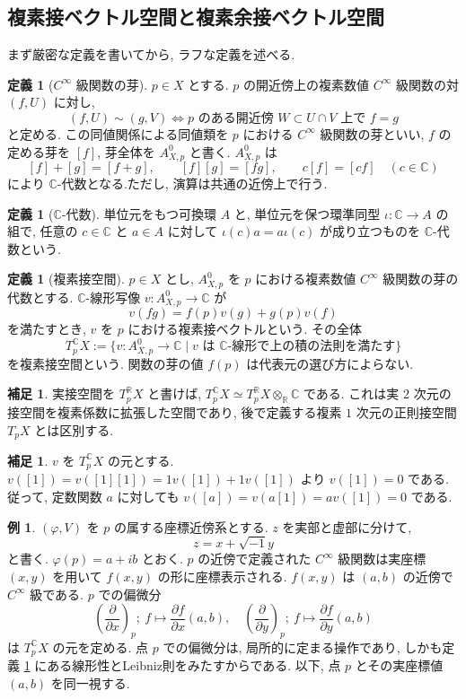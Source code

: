 \documentclass[dvipdfmx,a4paper,11pt]{article} %
\newcommand{\C}{\mathbb{C}}
\theoremstyle{definition}
\numberwithin{equation}{section}
\newtheorem{dfn}[thm]{定義}
\newtheorem{rem}[thm]{補足}
\newtheorem{ex}[thm]{例}
\begin{document}
\subsection{複素接ベクトル空間と複素余接ベクトル空間}\label{O-S018}

まず厳密な定義を書いてから, ラフな定義を述べる. 
\begin{dfn}[$C^\infty$ 級関数の芽]\label{dfn-smooth-germ}
$p\in X$ とする.
$p$ の開近傍上の複素数値 $C^\infty$ 級関数の対 $(f,U)$ に対し, 
\[
(f,U)\sim(g,V)
\iff
p\text{ のある開近傍 }W\subset U\cap V\text{ 上で }f=g
\]
と定める.
この同値関係による同値類を $p$ における $C^\infty$ 級関数の芽といい, 
$f$ の定める芽を $[f]$, 芽全体を $A^0_{X,p}$ と書く.
$A^0_{X,p}$ は
\[
[f]+[g]=[f+g],\qquad [f][g]=[fg],\qquad c[f]=[cf]\quad(c\in\C)
\]
により $\C$-代数となる.ただし, 演算は共通の近傍上で行う.
\end{dfn}

\begin{dfn}[$\C$-代数]
単位元をもつ可換環 $A$ と, 単位元を保つ環準同型
\(
\iota:\C\longrightarrow A
\)
の組で, 任意の $c\in\C$ と $a\in A$ に対して
\(
\iota(c)a=a\iota(c)
\)
が成り立つものを $\C$-代数という.
\end{dfn}

\begin{dfn}[複素接空間]\label{O-M078}
$p\in X$ とし, $A^0_{X,p}$ を $p$ における複素数値 $C^\infty$ 級関数の芽の代数とする.
$\C$-線形写像 $v:A^0_{X,p}\to\C$ が
\[
v(fg)=f(p)v(g)+g(p)v(f)
\]
を満たすとき, $v$ を $p$ における複素接ベクトルという.
その全体
\[
T_p^{\C}X
:=
\{v:A^0_{X,p}\to\C\mid v\text{ は }\C\text{-線形で上の積の法則を満たす}\}
\]
を複素接空間という.
関数の芽の値 $f(p)$ は代表元の選び方によらない.
\end{dfn}
\begin{rem}
実接空間を $T_p^{\mathbb R}X$ と書けば,
$T_p^\C X\simeq T_p^{\mathbb R}X\otimes_{\mathbb R}\C$ である.
これは実 $2$ 次元の接空間を複素係数に拡張した空間であり,
後で定義する複素 $1$ 次元の正則接空間 $T_pX$ とは区別する.
\end{rem}

\begin{rem}
$v$ を $T_{p}^{\C}X$ の元とする. $v([1])=v([1][1])=1v([1])+1v([1])$ より $v([1])=0$ である. 従って, 定数関数 $a$ に対しても $v([a])=v(a[1])=av([1])=0$ である.
\end{rem}

\begin{ex}
$(\varphi,V)$ を $p$ の属する座標近傍系とする. $z$ を実部と虚部に分けて,
\[
z=x+\sqrt{-1}y
\]
と書く. $\varphi(p)=a+ib$ とおく. $p$ の近傍で定義された $C^\infty$ 級関数は実座標 $(x,y)$ を用いて $f(x,y)$ の形に座標表示される. $f(x,y)$ は $(a,b)$ の近傍で $C^\infty$ 級である. $p$ での偏微分
\[
\left(\frac{\partial}{\partial x}\right)_p;\ f\longmapsto \frac{\partial f}{\partial x}(a,b),\quad
\left(\frac{\partial}{\partial y}\right)_p;\ f\longmapsto \frac{\partial f}{\partial y}(a,b)
\]
は $T_{p}^{\C}X$ の元を定める. 点 $p$ での偏微分は, 局所的に定まる操作であり, しかも定義 \ref{O-M078} にある線形性とLeibniz則をみたすからである. 以下, 点 $p$ とその実座標値 $(a,b)$ を同一視する.
\end{ex}
\end{document}
